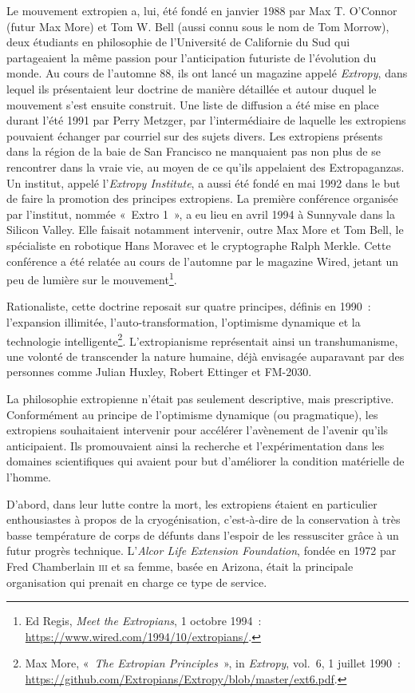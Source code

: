 \documentclass[
  a5paper,
  smalldemyvopaper,10pt,twoside,onecolumn,openright,extrafontsizes,hidelinks]{memoir}
\begin{document}
Le mouvement extropien a, lui, été fondé en janvier 1988 par Max T.
O'Connor (futur Max More) et Tom W. Bell (aussi connu sous le nom de Tom
Morrow), deux étudiants en philosophie de l'Université de Californie du
Sud qui partageaient la même passion pour l'anticipation futuriste de
l'évolution du monde. Au cours de l'automne 88, ils ont lancé un
magazine appelé \emph{Extropy}, dans lequel ils présentaient leur
doctrine de manière détaillée et autour duquel le mouvement s'est
ensuite construit. Une liste de diffusion a été mise en place durant
l'été 1991 par Perry Metzger, par l'intermédiaire de laquelle les
extropiens pouvaient échanger par courriel sur des sujets divers. Les
extropiens présents dans la région de la baie de San Francisco ne
manquaient pas non plus de se rencontrer dans la vraie vie, au moyen de
ce qu'ils appelaient des Extropaganzas. Un institut, appelé
l'\emph{Extropy Institute}, a aussi été fondé en mai 1992 dans le but de
faire la promotion des principes extropiens. La première conférence
organisée par l'institut, nommée «~Extro 1~», a eu lieu en avril 1994 à
Sunnyvale dans la Silicon Valley. Elle faisait notamment intervenir,
outre Max More et Tom Bell, le spécialiste en robotique Hans Moravec et
le cryptographe Ralph Merkle. Cette conférence a été relatée au cours de
l'automne par le magazine Wired, jetant un peu de lumière sur le
mouvement\footnote{Ed Regis, \emph{Meet the Extropians}, 1 octobre
  1994~: \url{https://www.wired.com/1994/10/extropians/}.}.

Rationaliste, cette doctrine reposait sur quatre principes, définis en
1990~: l'expansion illimitée, l'auto-transformation, l'optimisme
dynamique et la technologie intelligente\footnote{Max More, «~\emph{The
  Extropian Principles}~», in \emph{Extropy}, vol.~6, 1 juillet 1990~:
  \url{https://github.com/Extropians/Extropy/blob/master/ext6.pdf}.}.
L'extropianisme représentait ainsi un transhumanisme, une volonté de
transcender la nature humaine, déjà envisagée auparavant par des
personnes comme Julian Huxley, Robert Ettinger et FM-2030.

La philosophie extropienne n'était pas seulement descriptive, mais
prescriptive. Conformément au principe de l'optimisme dynamique (ou
pragmatique), les extropiens souhaitaient intervenir pour accélérer
l'avènement de l'avenir qu'ils anticipaient. Ils promouvaient ainsi la
recherche et l'expérimentation dans les domaines scientifiques qui
avaient pour but d'améliorer la condition matérielle de l'homme.

D'abord, dans leur lutte contre la mort, les extropiens étaient en
particulier enthousiastes à propos de la cryogénisation, c'est-à-dire de
la conservation à très basse température de corps de défunts dans
l'espoir de les ressusciter grâce à un futur progrès technique.
L'\emph{Alcor Life Extension Foundation}, fondée en 1972 par Fred
Chamberlain \textsc{iii} et sa femme, basée en Arizona, était la
principale organisation qui prenait en charge ce type de service.
\end{document}
